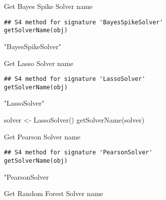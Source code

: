 \documentclass[a4paper]{book}
\begin{document}
%
\begin{Description}\relax
Get Bayes Spike Solver name
\end{Description}
%
\begin{Usage}
\begin{verbatim}
## S4 method for signature 'BayesSpikeSolver'
getSolverName(obj)
\end{verbatim}
\end{Usage}
%
\begin{Value}
"BayesSpikeSolver"
\end{Value}
%
\begin{Description}\relax
Get Lasso Solver name
\end{Description}
%
\begin{Usage}
\begin{verbatim}
## S4 method for signature 'LassoSolver'
getSolverName(obj)
\end{verbatim}
\end{Usage}
%
\begin{Value}
"LassoSolver"
\end{Value}
%
\begin{Examples}
\begin{ExampleCode}
solver <- LassoSolver()
getSolverName(solver)
\end{ExampleCode}
\end{Examples}
%
\begin{Description}\relax
Get Pearson Solver name
\end{Description}
%
\begin{Usage}
\begin{verbatim}
## S4 method for signature 'PearsonSolver'
getSolverName(obj)
\end{verbatim}
\end{Usage}
%
\begin{Value}
"PearsonSolver
\end{Value}
%
\begin{Description}\relax
Get Random Forest Solver name
\end{Description}
\end{document}
